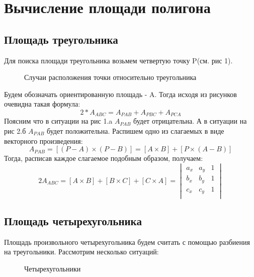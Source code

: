 \section{Вычисление площади полигона}

\subsection{Площадь треугольника} 
Для поиска площади треугольника возьмем четвертую точку P(см. рис 1).
\begin{figure}[h]
\begin{minipage}[h]{0.49\linewidth}
\end{minipage}
\hfill
\begin{minipage}[h]{0.49\linewidth}
\end{minipage}
\caption{Случаи расположения точки относительно треугольника}
\label{pic:isect_1}
\end{figure}

Будем обозначать ориентированную площадь - A. Тогда исходя из рисунков очевидна такая формула: 
$$
2*A_{ABC} = A_{PAB} + A_{PBC} + A_{PCA}
$$
Поясним что в ситуации на рис 1.a $A_{PAB}$ будет отрицательна. А в ситуации на рис 2.б $A_{PAB}$ будет положительна.
Распишем одно из слагаемых в виде векторного произведения:
$$
A_{PAB} = [(P - A) \times (P - B)]  = [A \times B] + [P \times (A - B)]
$$
Тогда, расписав каждое слагаемое подобным образом, получаем:
$$
2A_{ABC} = [A \times B] + [B \times C] + [C \times A] = \begin{vmatrix} a_{x} & a_{y} & 1 \\ b_{x} & b_{y} & 1 \\ c_{x} & c_{y} & 1 \\\end{vmatrix}
$$

\subsection{Площадь четырехугольника} 
Площадь произвольного четырехугольника будем считать с помощью разбиения на треугольники. Рассмотрим несколько ситуаций: 

\begin{figure}[h]
\begin{minipage}[h]{0.49\linewidth}
\end{minipage}
\hfill
\begin{minipage}[h]{0.49\linewidth}
\end{minipage}
\caption{Четырехугольники}
\label{pic:isect_1}
\end{figure}

